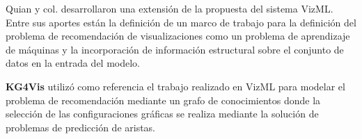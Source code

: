 Quian y col. \cite{qian2020ml} desarrollaron una extensi\'on de la propuesta del sistema VizML.
Entre sus aportes est\'an la definici\'on de un marco de trabajo para la definici\'on del problema
de recomendaci\'on de visualizaciones como un problema de aprendizaje de m\'aquinas y la incorporaci\'on
de informaci\'on estructural sobre el conjunto de datos en la entrada del modelo.

\textbf{KG4Vis} \cite{li2021kg4vis} utiliz\'o
como referencia el trabajo realizado en VizML para modelar el problema de recomendaci\'on
mediante un grafo de conocimientos donde la selecci\'on de las configuraciones gr\'aficas se realiza
mediante la soluci\'on de problemas de predicci\'on de aristas.









